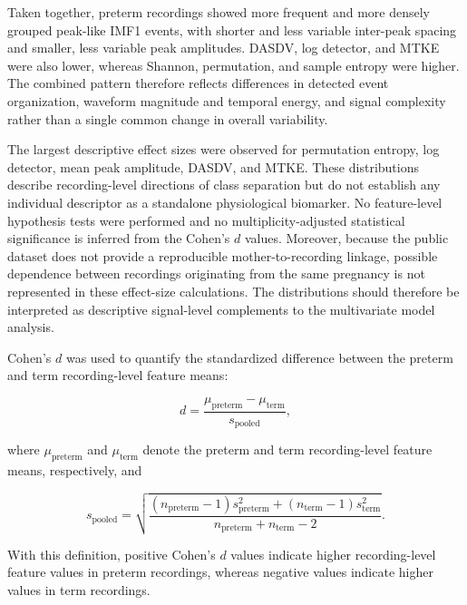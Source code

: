 \documentclass[10pt,letterpaper]{article}
\begin{document}
Taken together, preterm recordings showed more frequent and more densely grouped peak-like IMF1 events, with shorter and less variable inter-peak spacing and smaller, less variable peak amplitudes. DASDV, log detector, and MTKE were also lower, whereas Shannon, permutation, and sample entropy were higher. The combined pattern therefore reflects differences in detected event organization, waveform magnitude and temporal energy, and signal complexity rather than a single common change in overall variability.

The largest descriptive effect sizes were observed for permutation entropy, log detector, mean peak amplitude, DASDV, and MTKE. These distributions describe recording-level directions of class separation but do not establish any individual descriptor as a standalone physiological biomarker. No feature-level hypothesis tests were performed and no multiplicity-adjusted statistical significance is inferred from the Cohen's $d$ values. Moreover, because the public dataset does not provide a reproducible mother-to-recording linkage, possible dependence between recordings originating from the same pregnancy is not represented in these effect-size calculations. The distributions should therefore be interpreted as descriptive signal-level complements to the multivariate model analysis.

Cohen's $d$ was used to quantify the standardized difference between the preterm and term recording-level feature means:

\begin{equation}
d =
\frac{\mu_{\mathrm{preterm}}-\mu_{\mathrm{term}}}
{s_{\mathrm{pooled}}},
\end{equation}

where $\mu_{\mathrm{preterm}}$ and $\mu_{\mathrm{term}}$ denote the preterm and term recording-level feature means, respectively, and

\begin{equation}
s_{\mathrm{pooled}}
=
\sqrt{
\frac{
(n_{\mathrm{preterm}}-1)s_{\mathrm{preterm}}^2
+
(n_{\mathrm{term}}-1)s_{\mathrm{term}}^2
}{
n_{\mathrm{preterm}}+n_{\mathrm{term}}-2
}
}.
\end{equation}

With this definition, positive Cohen's $d$ values indicate higher recording-level feature values in preterm recordings, whereas negative values indicate higher values in term recordings.
\end{document}

